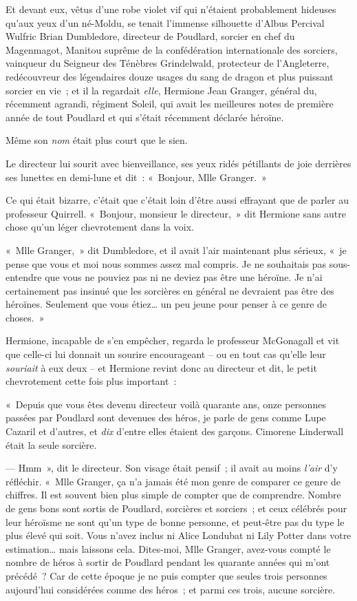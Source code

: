 Et devant eux, vêtus d'une robe violet vif qui n'étaient probablement hideuses qu'aux yeux d'un né-Moldu, se tenait l'immense silhouette d'Albus Percival Wulfric Brian Dumbledore, directeur de Poudlard, sorcier en chef du Magenmagot, Manitou suprême de la confédération internationale des sorciers, vainqueur du Seigneur des Ténèbres Grindelwald, protecteur de l'Angleterre, redécouvreur des légendaires douze usages du sang de dragon et plus puissant sorcier en vie~; et il la regardait \emph{elle}, Hermione Jean Granger, général du, récemment agrandi, régiment Soleil, qui avait les meilleures notes de première année de tout Poudlard et qui s'était récemment déclarée héroïne.

Même son \emph{nom} était plus court que le sien.

Le directeur lui sourit avec bienveillance, ses yeux ridés pétillants de joie derrières ses lunettes en demi-lune et dit~: «~Bonjour, Mlle Granger.~»

Ce qui était bizarre, c'était que c'était loin d'être aussi effrayant que de parler au professeur Quirrell. «~Bonjour, monsieur le directeur,~» dit Hermione sans autre chose qu'un léger chevrotement dans la voix.

«~Mlle Granger,~» dit Dumbledore, et il avait l'air maintenant plus sérieux, «~je pense que vous et moi nous sommes assez mal compris. Je ne souhaitais pas sous-entendre que vous ne pouviez pas ni ne deviez pas être une héroïne. Je n'ai certainement pas insinué que les sorcières en général ne devraient pas être des héroïnes. Seulement que vous étiez… un peu jeune pour penser à ce genre de choses.~»

Hermione, incapable de s'en empêcher, regarda le professeur McGonagall et vit que celle-ci lui donnait un sourire encourageant -- ou en tout cas qu'elle leur \emph{souriait} à eux deux -- et Hermione revint donc au directeur et dit, le petit chevrotement cette fois plus important~:

«~Depuis que vous êtes devenu directeur voilà quarante ans, onze personnes passées par Poudlard sont devenues des héros, je parle de gens comme Lupe Cazaril et d'autres, et \emph{dix} d'entre elles étaient des garçons. Cimorene Linderwall était la seule sorcière.

--- Hmm~», dit le directeur. Son visage était pensif~; il avait au moins \emph{l'air} d'y réfléchir. «~Mlle Granger, ça n'a jamais été mon genre de comparer ce genre de chiffres. Il est souvent bien plus simple de compter que de comprendre. Nombre de gens bons sont sortis de Poudlard, sorcières et sorciers~; et ceux célébrés pour leur héroïsme ne sont qu'un type de bonne personne, et peut-être pas du type le plus élevé qui soit. Vous n'avez inclus ni Alice Londubat ni Lily Potter dans votre estimation… mais laissons cela. Dites-moi, Mlle Granger, avez-vous compté le nombre de héros à sortir de Poudlard pendant les quarante années qui m'ont précédé~? Car de cette époque je ne puis compter que seules trois personnes aujourd'hui considérées comme des héros~; et parmi ces trois, aucune sorcière.

